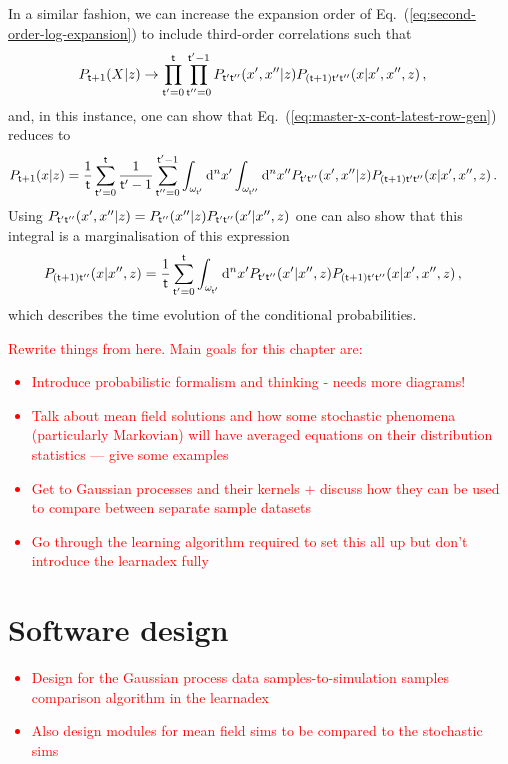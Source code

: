 In a similar fashion, we can increase the expansion order of Eq.~(\ref{eq:second-order-log-expansion}) to include third-order correlations such that 
\begin{align}
P_{{\sf t}+1}(X\vert z) &\rightarrow \prod_{{\sf t}'=0}^{{\sf t}}\prod_{{\sf t}''=0}^{{\sf t}'-1} P_{{\sf t}'{\sf t}''}(x',x''\vert z)P_{({\sf t}+1){\sf t}'{\sf t}''}(x\vert x',x'',z) \,,
\end{align}
and, in this instance, one can show that Eq.~(\ref{eq:master-x-cont-latest-row-gen}) reduces to
\begin{align}
P_{{\sf t}+1}(x\vert z) &= \frac{1}{{\sf t}}\sum_{{\sf t}'=0}^{{\sf t}}\frac{1}{{\sf t}'-1}\sum_{{\sf t}''=0}^{{\sf t}'-1}\int_{\omega_{{\sf t}'}}{\rm d}^nx'\int_{\omega_{{\sf t}''}}{\rm d}^nx'' P_{{\sf t}'{\sf t}''}(x',x''\vert z)P_{({\sf t}+1){\sf t}'{\sf t}''}(x\vert x',x'',z) \label{eq:third-order-correl} \,.
\end{align}
Using $P_{{\sf t}'{\sf t}''}(x',x''\vert z) = P_{{\sf t}''}(x''\vert z) P_{{\sf t}'{\sf t}''}(x'\vert x'', z)$ one can also show that this integral is a marginalisation of this expression
\begin{align}
P_{({\sf t}+1){\sf t}''}(x\vert x'', z) &= \frac{1}{{\sf t}}\sum_{{\sf t}'=0}^{{\sf t}}\int_{\omega_{{\sf t}'}}{\rm d}^nx'P_{{\sf t}'{\sf t}''}(x'\vert x'',z)P_{({\sf t}+1){\sf t}'{\sf t}''}(x\vert x',x'',z) \,,
\end{align}
which describes the time evolution of the conditional probabilities.

\textcolor{red}{
Rewrite things from here. Main goals for this chapter are:
\begin{itemize}
\item{Introduce probabilistic formalism and thinking - needs more diagrams!}
\item{Talk about mean field solutions and how some stochastic phenomena (particularly Markovian) will have averaged equations on their distribution statistics --- give some examples}
\item{Get to Gaussian processes and their kernels + discuss how they can be used to compare between separate sample datasets}
\item{Go through the learning algorithm required to set this all up but don't introduce the learnadex fully}
\end{itemize}
}

\section{\sffamily Software design}

\textcolor{red}{
\begin{itemize}
\item{Design for the Gaussian process data samples-to-simulation samples comparison algorithm in the learnadex}
\item{Also design modules for mean field sims to be compared to the stochastic sims}
\end{itemize}
}

    